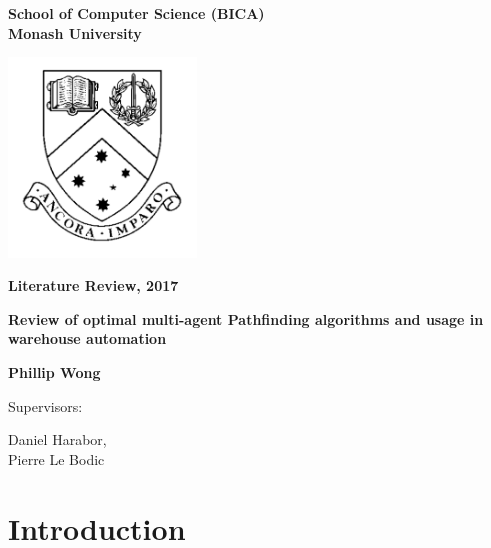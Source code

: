 \documentclass[a4paper,11pt]{article}
\begin{document}
	
\thispagestyle{empty} %
\renewcommand{\thepage}{\roman{page}}

\begin{spacing}{1.5}
	\begin{center}
		{\Large \bfseries
			School of Computer Science (BICA) \\
			Monash University}
		
		
		\vspace*{30mm}
		
		\includegraphics[width=5cm]{graphics/MonashCrest.pdf}
		
		\vspace*{15mm}
		
		{\large \bfseries
			Literature Review, 2017
		}
		
		\vspace*{10mm}
		
		{\LARGE \bfseries
			Review of optimal multi-agent Pathfinding algorithms and usage in warehouse automation
		}
		
		\vspace*{20mm}
		
		{\large \bfseries
			Phillip Wong
			
			\vspace*{20mm}
			
			
			Supervisors: \parbox[t]{50mm}{Daniel Harabor,\\Pierre Le Bodic}
		}
		
	\end{center}
\end{spacing}

\newpage

\tableofcontents

\newpage
\setcounter{page}{1}
\renewcommand{\thepage}{\arabic{page}}

\section{Introduction} \label{sec:introduction}
\end{document}
